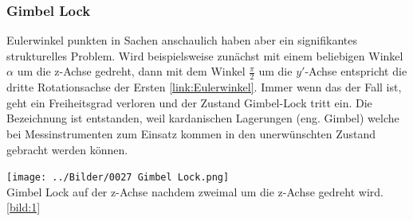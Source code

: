 \subsubsection{Gimbel Lock}
Eulerwinkel punkten in Sachen anschaulich haben aber ein signifikantes strukturelles Problem.
Wird beispielsweise zunächst mit einem beliebigen Winkel $\alpha$ um die z-Achse gedreht, dann mit dem Winkel $\frac{\pi}{2}$ um die $y'$-Achse entspricht die dritte Rotationsachse der Ersten \ref{link:Eulerwinkel}. Immer wenn das der Fall ist, geht ein Freiheitsgrad verloren und der Zustand Gimbel-Lock tritt ein. Die Bezeichnung ist entstanden, weil kardanischen Lagerungen (eng. Gimbel) welche bei Messinstrumenten zum Einsatz kommen in den unerwünschten Zustand gebracht werden können.
\begin{center}
	\texttt{[image: ../Bilder/0027 Gimbel Lock.png]}{\\Gimbel Lock auf der z-Achse nachdem zweimal um die z-Achse gedreht wird. \ref{bild:1}}
\end{center}


